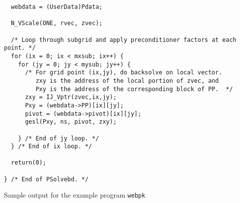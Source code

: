\begin{verbatim}
  webdata = (UserData)Pdata;

  N_VScale(ONE, rvec, zvec);

  /* Loop through subgrid and apply preconditioner factors at each point. */
  for (ix = 0; ix < mxsub; ix++) {
    for (jy = 0; jy < mysub; jy++) {
      /* For grid point (ix,jy), do backsolve on local vector. 
         zxy is the address of the local portion of zvec, and
         Pxy is the address of the corresponding block of PP.  */
      zxy = IJ_Vptr(zvec,ix,jy);
      Pxy = (webdata->PP)[ix][jy];
      pivot = (webdata->pivot)[ix][jy];
      gesl(Pxy, ns, pivot, zxy);

    } /* End of jy loop. */
  } /* End of ix loop. */

  return(0);

} /* End of PSolvebd. */

\end{verbatim}

\vspace*{.3in}

\normalsize

\noindent
Sample output for the example program {\tt webpk}

